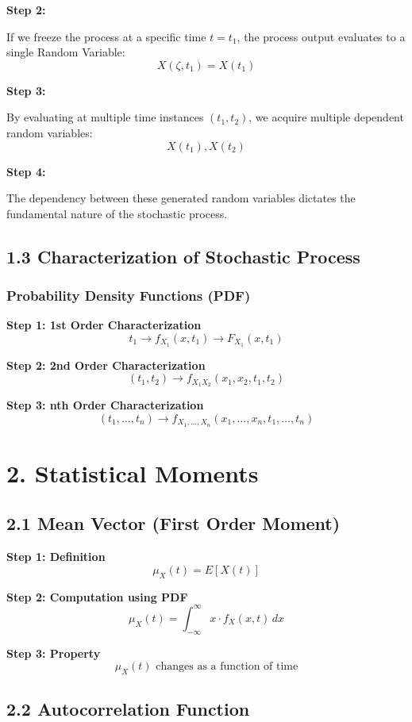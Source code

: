 \documentclass[12pt]{article}
\begin{document}
\textbf{Step 2:}

If we freeze the process at a specific time \( t = t_1 \), the process output evaluates to a single Random Variable:
\[
X(\zeta, t_1) = X(t_1)
\]

\textbf{Step 3:}

By evaluating at multiple time instances \( (t_1, t_2) \), we acquire multiple dependent random variables:
\[
X(t_1), X(t_2)
\]

\textbf{Step 4:}

The dependency between these generated random variables dictates the fundamental nature of the stochastic process.

\subsection*{1.3 Characterization of Stochastic Process}

\subsubsection*{Probability Density Functions (PDF)}

\textbf{Step 1: 1st Order Characterization}
\[
t_1 \rightarrow f_{X_1}(x, t_1) \rightarrow F_{X_1}(x, t_1)
\]

\textbf{Step 2: 2nd Order Characterization}
\[
(t_1, t_2) \rightarrow f_{X_1 X_2}(x_1, x_2, t_1, t_2)
\]

\textbf{Step 3: nth Order Characterization}
\[
(t_1, \dots, t_n) \rightarrow f_{X_1,\dots,X_n}(x_1,\dots,x_n, t_1,\dots,t_n)
\]

\section*{2. Statistical Moments}

\subsection*{2.1 Mean Vector (First Order Moment)}

\textbf{Step 1: Definition}
\[
\mu_X(t) = E[X(t)]
\]

\textbf{Step 2: Computation using PDF}
\[
\mu_X(t) = \int_{-\infty}^{\infty} x \cdot f_X(x,t)\,dx
\]

\textbf{Step 3: Property}
\[
\mu_X(t) \text{ changes as a function of time}
\]

\subsection*{2.2 Autocorrelation Function}
\end{document}
